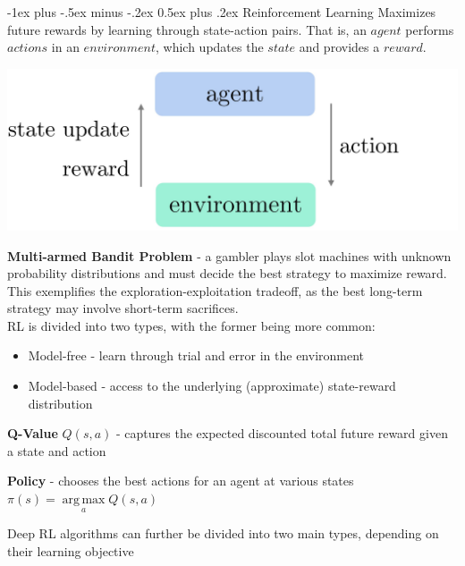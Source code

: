 \documentclass[10pt,landscape]{article}
\makeatletter
\DeclareMathOperator*{\argmax}{arg\,max}
\renewcommand{\section}{\@startsection{section}{1}{0mm}%
                                {-1ex plus -.5ex minus -.2ex}%
                                {0.5ex plus .2ex}%
                                {\normalfont\large\bfseries}}
\makeatother
\begin{document}
\begin{multicols}{3}
\section{Reinforcement Learning}
Maximizes future rewards by learning through state-action pairs. That is, an $agent$ performs $actions$ in an $environment$, which updates the $state$ and provides a $reward$. 

\begin{center}
\vspace{-2mm}
    \includegraphics[scale = .085]{images/reinforcement4.JPG}
\end{center}
\vspace{-2.5mm}
\textbf{Multi-armed Bandit Problem} - a gambler plays slot machines with unknown probability distributions and must decide the best strategy to maximize reward. This exemplifies the exploration-exploitation tradeoff, as the best long-term strategy may involve short-term sacrifices.\\
\smallskip
RL is divided into two types, with the former being more common:
\begin{itemize}[label={--},leftmargin=4mm]
\itemsep -.4mm 
\item Model-free - learn through trial and error in the environment 
\item Model-based - access to the underlying (approximate) state-reward distribution
\end{itemize}

\textbf{Q-Value} $Q(s,a)$ - captures the expected discounted total future reward given a state and action

\textbf{Policy} - chooses the best actions for an agent at various states \\
$ \pi(s) = \argmax\limits_a Q(s,a)$\\
\smallskip

Deep RL algorithms can further be divided into two main types, depending on their learning objective


\end{multicols}
\end{document}
